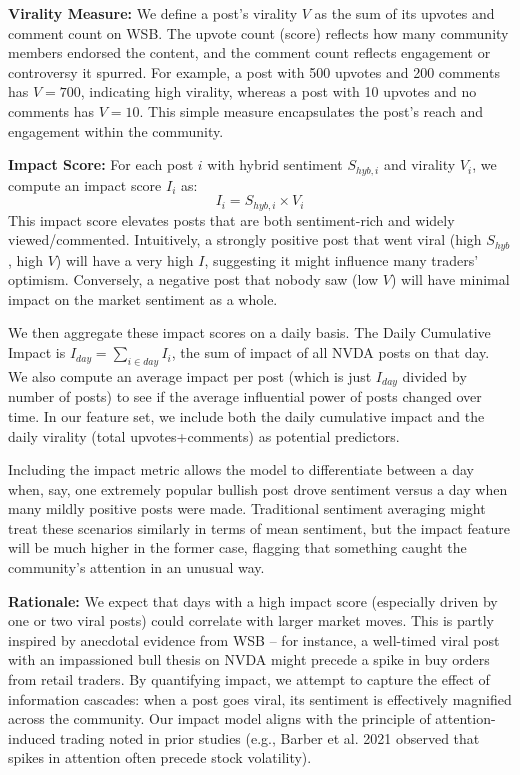 \documentclass[conference]{IEEEtran}
\begin{document}
\textbf{Virality Measure:} We define a post’s virality $V$ as the sum of its upvotes and comment count on WSB. The upvote count (score) reflects how many community members endorsed the content, and the comment count reflects engagement or controversy it spurred. For example, a post with 500 upvotes and 200 comments has $V=700$, indicating high virality, whereas a post with 10 upvotes and no comments has $V=10$. This simple measure encapsulates the post’s reach and engagement within the community.

\textbf{Impact Score:} For each post $i$ with hybrid sentiment $S_{hyb,i}$ and virality $V_i$, we compute an impact score $I_i$ as:
\begin{equation}
	I_i = S_{hyb,i} \times V_i
\end{equation}
This impact score elevates posts that are both sentiment-rich and widely viewed/commented. Intuitively, a strongly positive post that went viral (high $S_{hyb}$, high $V$) will have a very high $I$, suggesting it might influence many traders’ optimism. Conversely, a negative post that nobody saw (low $V$) will have minimal impact on the market sentiment as a whole.

We then aggregate these impact scores on a daily basis. The Daily Cumulative Impact is $I_{day} = \sum_{i \in day} I_i$, the sum of impact of all NVDA posts on that day. We also compute an average impact per post (which is just $I_{day}$ divided by number of posts) to see if the average influential power of posts changed over time. In our feature set, we include both the daily cumulative impact and the daily virality (total upvotes+comments) as potential predictors.

Including the impact metric allows the model to differentiate between a day when, say, one extremely popular bullish post drove sentiment versus a day when many mildly positive posts were made. Traditional sentiment averaging might treat these scenarios similarly in terms of mean sentiment, but the impact feature will be much higher in the former case, flagging that something caught the community’s attention in an unusual way.

\textbf{Rationale:} We expect that days with a high impact score (especially driven by one or two viral posts) could correlate with larger market moves. This is partly inspired by anecdotal evidence from WSB – for instance, a well-timed viral post with an impassioned bull thesis on NVDA might precede a spike in buy orders from retail traders. By quantifying impact, we attempt to capture the effect of information cascades: when a post goes viral, its sentiment is effectively magnified across the community. Our impact model aligns with the principle of attention-induced trading noted in prior studies (e.g., Barber et al. 2021 observed that spikes in attention often precede stock volatility).
\end{document}

